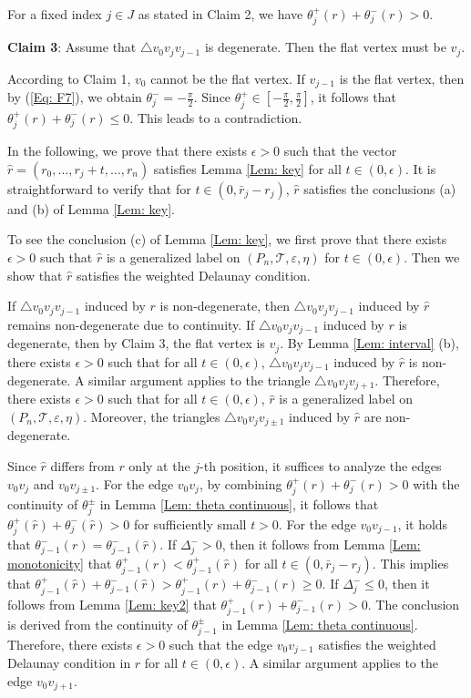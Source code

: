 \documentclass[12pt]{amsart}
\theoremstyle{definition}
\begin{document}
For a fixed index $j \in J$ as stated in Claim 2, we have  $\theta_j^+(r)+\theta_j^-(r)>0$.

\textbf{Claim 3}:
Assume that $\triangle v_0v_jv_{j-1}$ is degenerate.
Then the flat vertex must be $v_j$.

According to Claim 1, $v_0$ cannot be the flat vertex.
If $v_{j-1}$ is the flat vertex, then by (\ref{Eq: F7}), we obtain $\theta_j^-=-\frac{\pi}{2}$.
Since $\theta_j^+ \in \left[-\frac{\pi}{2}, \frac{\pi}{2}\right]$,
it follows that $\theta_j^+(r) + \theta_j^-(r) \leq 0$.
This leads to a contradiction.

In the following, we prove that there exists $\epsilon>0$ such that the vector $\hat{r}=(r_0,\dots,r_j+t,\dots,r_n)$ satisfies Lemma \ref{Lem: key} for all $t\in(0,\epsilon)$. 
It is straightforward to verify that for $t\in(0,\bar{r}_j-r_j)$, $\hat{r}$  satisfies the conclusions (a) and (b) of Lemma \ref{Lem: key}.

To see the conclusion (c) of Lemma \ref{Lem: key}, we first prove that there exists $\epsilon>0$ such that
$\hat{r}$ is a generalized label on $(P_n, \mathcal{T}, \varepsilon, \eta)$ for $t\in (0,\epsilon)$.
Then we show that $\hat{r}$ satisfies the weighted Delaunay condition.

If $\triangle v_0v_jv_{j-1}$ induced by $r$ is non-degenerate,  
then $\triangle v_0v_jv_{j-1}$ induced by $\hat{r}$ remains non-degenerate due to continuity.  
If $\triangle v_0v_jv_{j-1}$ induced by $r$ is degenerate, then by Claim 3, the flat vertex is $v_j$.  
By Lemma \ref{Lem: interval} (b), there exists $\epsilon>0$ such that for all $t\in(0,\epsilon)$,  
$\triangle v_0v_jv_{j-1}$ induced by $\hat{r}$ is non-degenerate.  
A similar argument applies to the triangle $\triangle v_0v_jv_{j+1}$.  
Therefore, there exists $\epsilon>0$ such that for all $t\in(0,\epsilon)$,  
$\hat{r}$ is a generalized label on $(P_n,\mathcal{T},\varepsilon,\eta)$.  
Moreover, the triangles $\triangle v_0v_jv_{j\pm1}$ induced by $\hat{r}$ are non-degenerate.

Since $\hat{r}$ differs from $r$ only at the $j$-th position,  
it suffices to analyze the edges $v_0v_j$ and $v_0v_{j\pm1}$.  
For the edge $v_0v_j$, by combining $\theta_j^+(r)+\theta_j^-(r)>0$ with the continuity of $\theta_j^{\pm}$ in Lemma \ref{Lem: theta continuous},
it follows that $\theta_j^+(\hat{r})+\theta_j^-(\hat{r})>0$ for sufficiently small $t>0$. 
For the edge $v_0v_{j-1}$, it holds that $\theta_{j-1}^-(r)=\theta_{j-1}^-(\hat{r})$.  
If $\Delta_j^->0$, then it follows from Lemma \ref{Lem: monotonicity} that $\theta_{j-1}^+(r)<\theta_{j-1}^+(\hat{r})$ for all $t\in(0,\bar{r}_j-r_j)$.  
This implies that $\theta_{j-1}^+(\hat{r})+\theta_{j-1}^-(\hat{r})  >\theta_{j-1}^+(r)+\theta_{j-1}^-(r)\ge0$.  
If $\Delta_j^-\leq0$, then it follows from Lemma \ref{Lem: key2} that $\theta_{j-1}^+(r)+\theta_{j-1}^-(r)>0$.  
The conclusion is derived from the continuity of $\theta_{j-1}^{\pm}$ in Lemma \ref{Lem: theta continuous}.  
Therefore, there exists $\epsilon>0$ such that the edge $v_0v_{j-1}$ satisfies the weighted Delaunay condition in $\hat{r}$ for all $t\in(0,\epsilon)$.  
A similar argument applies to the edge $v_0v_{j+1}$.
\end{document}
